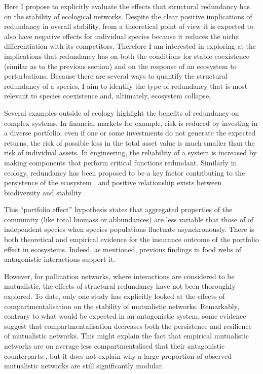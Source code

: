\documentclass[a4paper]{article}
\begin{document}
Here I propose to explicitly evaluate the effects that structural redundancy has on the stability of ecological networks.
Despite the clear positive implications of redundancy in overall stability, from a theoretical point of view it is expected to also have negative effects for individual species because it reduces the niche differentiation with its competitors.
Therefore I am interested in exploring at the implications that redundancy has on both the conditions for stable coexistence (similar as to the previous section) and on the response of an ecosystem to perturbations.
Because there are several ways to quantify the structural redundancy of a species, I aim to identify the type of redundancy that is most relevant to species coexistence and, ultimately, ecosystem collapse.

Several examples outside of ecology highlight the benefits of redundancy on complex systems.
In financial markets for example, risk is reduced by investing in a diverse portfolio; even if one or some investments do not generate the expected returns, the risk of possible loss in the total asset value is much smaller than the risk of individual assets.
In engineering, the reliability of a system is increased by making components that perform critical functions redundant.
Similarly in ecology, redundancy has been proposed to be a key factor contributing to the persistence of the ecosystem \autocite{Naeem1997,Naeem1998}, and positive relationship exists between biodiversity and stability \autocite{Tilman1996, Doak1998,Tilman1998}.

This ``portfolio effect'' hypothesis states that aggregated properties of the community (like total biomass or abbundances) are less variable that those of of independent species when species populations fluctuate asynchronously.
There is both theoretical \autocite{Tilman1998, Yachi1999} and empirical \autocite{Tilman1996,Tilman2006, Valone2008, Hector2010, Valone2008} evidence for the insurance outcome of the portfolio effect in ecosystems.
Indeed, as mentioned, previous findings in food webs of antagonistic interactions support it.


However, for pollination networks, where interactions are considered to be mutualistic, the effects of structural redundancy have not been thoroughly explored.
To date, only one study \autocite{Thebault2010} has explicitly looked at the effects of compartmentalisation on the stability of mutualistic networks.
Remarkably, contrary to what would be expected in an antagonistic system, some evidence suggest that compartmentalisation decreases both the persistence and resilience of mutualistic networks.
This might explain the fact that empirical mutualistic networks are on average less compartmentalised that their antagonistic counterparts \autocite{Thebault2010}, but it does not explain why a large proportion of observed mutualistic networks are still significantly modular.
\end{document}
